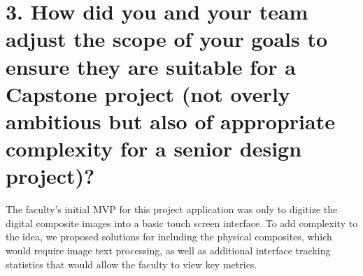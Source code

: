 \documentclass{article}
\begin{document}
\section*{3. How did you and your team adjust the scope of your goals to ensure they are suitable for a Capstone project (not overly ambitious but also of appropriate complexity for a senior design project)?}
The faculty’s initial MVP for this project application was only to digitize the digital composite images into a basic touch screen interface. To add complexity to the idea, we proposed solutions for including the physical composites, which would require image text processing, as well as additional interface tracking statistics that would allow the faculty to view key metrics.
\end{document}
